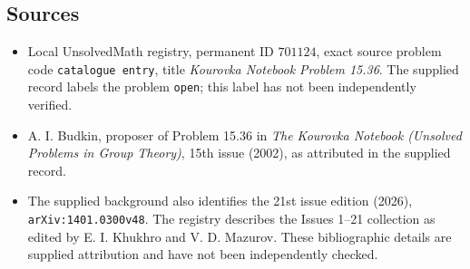 \documentclass[11pt]{article}
\begin{document}
\subsection{Sources}
\begin{itemize}
\item Local UnsolvedMath registry, permanent ID \(701124\), exact source problem code \texttt{catalogue entry}, title \emph{Kourovka Notebook Problem 15.36}. The supplied record labels the problem \texttt{open}; this label has not been independently verified.
\item A. I. Budkin, proposer of Problem 15.36 in \emph{The Kourovka Notebook (Unsolved Problems in Group Theory)}, 15th issue (2002), as attributed in the supplied record.
\item The supplied background also identifies the 21st issue edition (2026), \texttt{arXiv:1401.0300v48}. The registry describes the Issues 1--21 collection as edited by E. I. Khukhro and V. D. Mazurov. These bibliographic details are supplied attribution and have not been independently checked.
\end{itemize}
\end{document}
